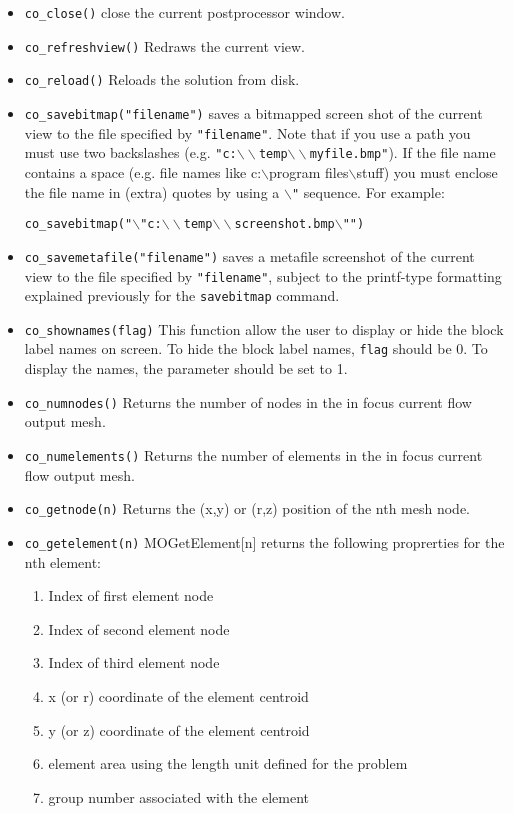 \begin{itemize}

\item \texttt{co\_close()} close the current postprocessor window.

\item{\tt co\_refreshview()} Redraws the current view.

\item{\tt co\_reload()} Reloads the solution from disk.

\item \texttt{co\_savebitmap("filename")} saves a bitmapped screen shot of the current
view to the file specified by \texttt{"filename"}. Note that if you
use a path you must use two backslashes (e.g.
\texttt{"c:$\backslash \backslash $temp$\backslash \backslash
$myfile.bmp"}). If the file name contains a space (e.g. file
names like c:$\backslash $program files$\backslash $stuff) you must
enclose the file name in (extra) quotes by using a
\texttt{$\backslash $"} sequence. For example:

\texttt{co\_savebitmap("$\backslash $"c:$\backslash \backslash
$temp$\backslash \backslash $screenshot.bmp$\backslash $"")}

\item \texttt{co\_savemetafile("filename")} saves a metafile screenshot of the current
view to the file specified by \texttt{"filename"}, subject to the
printf-type formatting explained previously for the
\texttt{savebitmap} command.

\item \texttt{co\_shownames(flag)} This function allow the user to display or hide the
block label names on screen. To hide the block label names,
\texttt{flag} should be 0. To display the names, the parameter
should be set to 1.


\item{\tt co\_numnodes()} Returns the number of nodes in the in focus current flow output mesh.
\item{\tt co\_numelements()} Returns the number of elements in the in focus current flow output mesh.
\item{\tt co\_getnode(n)} Returns the (x,y) or (r,z) position of the nth mesh node.
\item{\tt co\_getelement(n)} MOGetElement[n] returns the following proprerties for the nth element:
    \begin{enumerate}
        \item Index of first element node
        \item Index of second element node
        \item Index of third element node
        \item x (or r) coordinate of the element centroid
        \item y (or z) coordinate of the element centroid
        \item element area using the length unit defined for the problem
        \item group number associated with the element
    \end{enumerate}

\end{itemize}


